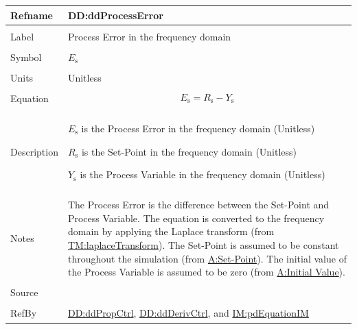 \documentclass[12pt]{article}
\begin{document}
\vspace{\baselineskip}
\noindent
\begin{minipage}{\textwidth}
\begin{tabular}{>{\raggedright}p{}>{\raggedright\arraybackslash}p{}}
\toprule \textbf{Refname} & \textbf{DD:ddProcessError}
\label{DD:ddProcessError}
\\ \midrule \\
Label & Process Error in the frequency domain
        
\\ \midrule \\
Symbol & ${E_{\text{s}}}$
         
\\ \midrule \\
Units & Unitless
        
\\ \midrule \\
Equation & \begin{displaymath}
           {E_{\text{s}}}={R_{\text{s}}}-{Y_{\text{s}}}
           \end{displaymath}
\\ \midrule \\
Description & \begin{symbDescription}
              \item{${E_{\text{s}}}$ is the Process Error in the frequency domain (Unitless)}
              \item{${R_{\text{s}}}$ is the Set-Point in the frequency domain (Unitless)}
              \item{${Y_{\text{s}}}$ is the Process Variable in the frequency domain (Unitless)}
              \end{symbDescription}
\\ \midrule \\
Notes & The Process Error is the difference between the Set-Point and Process Variable. The equation is converted to the frequency domain by applying the Laplace transform (from \hyperref[TM:laplaceTransform]{TM:laplaceTransform}). The Set-Point is assumed to be constant throughout the simulation (from \hyperref[setPoint]{A:Set-Point}). The initial value of the Process Variable is assumed to be zero (from \hyperref[initialValue]{A:Initial Value}).
        
\\ \midrule \\
Source & \cite{johnson2008}
         
\\ \midrule \\
RefBy & \hyperref[DD:ddPropCtrl]{DD:ddPropCtrl}, \hyperref[DD:ddDerivCtrl]{DD:ddDerivCtrl}, and \hyperref[IM:pdEquationIM]{IM:pdEquationIM}
        
\\ \bottomrule
\end{tabular}
\end{minipage}
\end{document}
